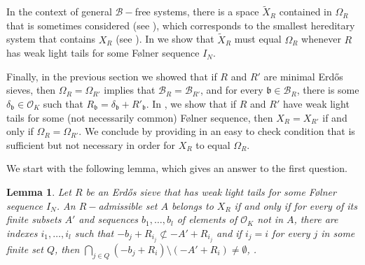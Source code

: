 \documentclass[a4paper,11pt,reqno]{amsart}
\theoremstyle{plain}
\newtheorem{lemma}[theorem]{Lemma}
\theoremstyle{remark}
\newcommand{\cb}{\mathcal{B}}
\newcommand{\co}{\mathcal{O}}
\newcommand{\gb}{\mathfrak{b}}
\begin{document}
			In the context of general $\cb-$free systems, there is a space $\widetilde{X}_R$ contained in $\Omega_R$ that is sometimes considered (see \cite{Dymek}), which corresponds to the smallest hereditary system that contains $X_R$ (see ). In  we show that $\widetilde{X}_R$ must equal $\Omega_{R}$ whenever $R$ has weak light tails for some Følner sequence $I_N$.
			
			Finally, in the previous section we showed that if $R$ and $R'$ are minimal Erdős sieves, then $\Omega_R = \Omega_{R'}$ implies that $\cb_R = \cb_{R'}$, and for every $\gb \in \cb_R$, there is some $\delta_\gb \in \co_K$ such that $R_\gb = \delta_\gb + R'_\gb$. In  , we show that if $R$ and $R'$ have weak light tails for some (not necessarily common) Følner sequence, then $X_R = X_{R'}$ if and only if $\Omega_R = \Omega_{R'}$. We conclude by providing in  an easy to check condition that is sufficient but not necessary in order for $X_R$ to equal $\Omega_R$.
			
			
			
			We start with the following lemma, which gives an answer to the first question.
			
			\begin{lemma}
				\label{lm: Conditions for A in X_R}
				Let $R$ be an Erdős sieve that has weak light tails for some Følner sequence $I_N$. An $R-$admissible set $A$ belongs to $X_R$ if and only if for every  of its finite subsets $A'$ and sequences $b_1, \dots, b_l $ of elements of $\co_K$ not in $A$, there are indexes $i_1, \dots, i_l$ such that $-b_j + R_{i_j} \not \subset -A'+ R_{i_j}$ and if $i_j = i$ for every $j$ in some finite set $Q$, then $\bigcap_{j \in Q} (-b_j + R_i) \setminus (-A'+R_i) \neq \emptyset$, .
			\end{lemma}
			
\end{document}
